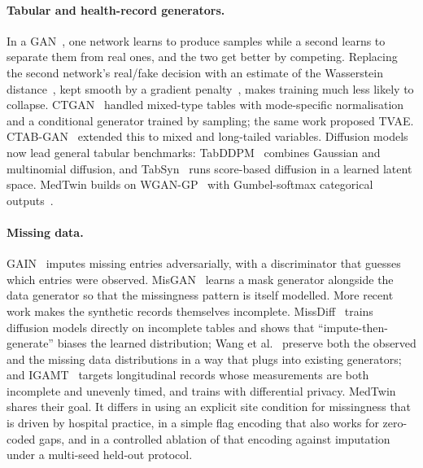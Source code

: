 \documentclass[runningheads]{llncs}
\begin{document}
\paragraph{Tabular and health-record generators.}
In a GAN~\cite{goodfellow2014gan}, one network learns to produce samples
while a second learns to separate them from real ones, and the two get better
by competing. Replacing the second network's real/fake
decision with an estimate of the Wasserstein distance~\cite{arjovsky2017wgan},
kept smooth by a gradient penalty~\cite{gulrajani2017wgangp}, makes training
much less likely to collapse. CTGAN~\cite{xu2019ctgan} handled mixed-type tables with
mode-specific normalisation and a conditional generator trained by
sampling; the same work proposed TVAE. CTAB-GAN~\cite{zhao2021ctabgan}
extended this to mixed and long-tailed variables. Diffusion models now lead
general tabular benchmarks: TabDDPM~\cite{kotelnikov2023tabddpm} combines
Gaussian and multinomial diffusion, and TabSyn~\cite{zhang2024tabsyn} runs
score-based diffusion in a learned latent space. MedTwin builds on WGAN-GP~\cite{gulrajani2017wgangp}
with Gumbel-softmax categorical outputs~\cite{jang2017gumbel}.

\paragraph{Missing data.}
GAIN~\cite{yoon2018gain} imputes missing entries adversarially, with a
discriminator that guesses which entries were observed.
MisGAN~\cite{li2019misgan} learns a mask generator alongside the data
generator so that the missingness pattern is itself modelled. More recent
work makes the synthetic records themselves incomplete. MissDiff~\cite{ouyang2023missdiff} trains
diffusion models directly on incomplete tables and shows that
``impute-then-generate'' biases the learned distribution; Wang et
al.~\cite{wang2025reinvented} preserve both the observed and the missing
data distributions in a way that plugs into existing generators; and
IGAMT~\cite{wang2024igamt} targets longitudinal records whose
measurements are both incomplete and unevenly timed, and trains with
differential privacy. MedTwin shares their goal.
It differs in using an explicit site condition for missingness that is
driven by hospital practice, in a simple flag encoding that also works for
zero-coded gaps, and in a controlled ablation of that encoding against
imputation under a multi-seed held-out protocol.
\end{document}
